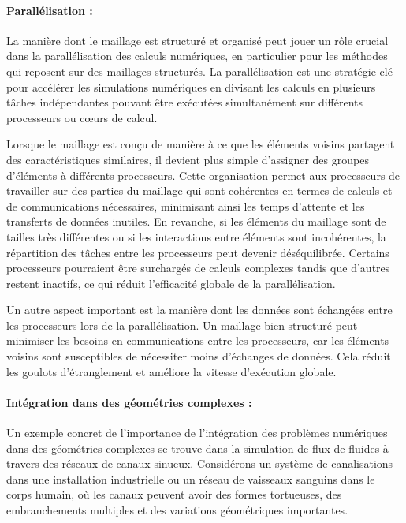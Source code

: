 \paragraph{Parallélisation :}

La manière dont le maillage est structuré et organisé peut jouer un rôle crucial dans la parallélisation des calculs numériques, en particulier pour les méthodes qui reposent sur des maillages structurés. La parallélisation est une stratégie clé pour accélérer les simulations numériques en divisant les calculs en plusieurs tâches indépendantes pouvant être exécutées simultanément sur différents processeurs ou cœurs de calcul.

Lorsque le maillage est conçu de manière à ce que les éléments voisins partagent des caractéristiques similaires, il devient plus simple d'assigner des groupes d'éléments à différents processeurs. Cette organisation permet aux processeurs de travailler sur des parties du maillage qui sont cohérentes en termes de calculs et de communications nécessaires, minimisant ainsi les temps d'attente et les transferts de données inutiles. En revanche, si les éléments du maillage sont de tailles très différentes ou si les interactions entre éléments sont incohérentes, la répartition des tâches entre les processeurs peut devenir déséquilibrée. Certains processeurs pourraient être surchargés de calculs complexes tandis que d'autres restent inactifs, ce qui réduit l'efficacité globale de la parallélisation.

Un autre aspect important est la manière dont les données sont échangées entre les processeurs lors de la parallélisation. Un maillage bien structuré peut minimiser les besoins en communications entre les processeurs, car les éléments voisins sont susceptibles de nécessiter moins d'échanges de données. Cela réduit les goulots d'étranglement et améliore la vitesse d'exécution globale.

\paragraph{Intégration dans des géométries complexes :}

Un exemple concret de l'importance de l'intégration des problèmes numériques dans des géométries complexes se trouve dans la simulation de flux de fluides à travers des réseaux de canaux sinueux. Considérons un système de canalisations dans une installation industrielle ou un réseau de vaisseaux sanguins dans le corps humain, où les canaux peuvent avoir des formes tortueuses, des embranchements multiples et des variations géométriques importantes.

